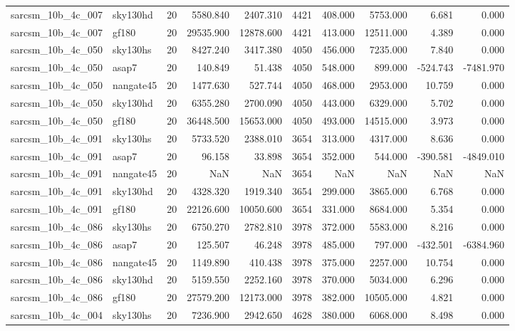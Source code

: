 \begin{longtable}{llrrrrrrrr}
sarcsm\_10b\_4c\_007 & sky130hd & 20 & 5580.840 & 2407.310 & 4421 & 408.000 & 5753.000 & 6.681 & 0.000 \\
sarcsm\_10b\_4c\_007 & gf180 & 20 & 29535.900 & 12878.600 & 4421 & 413.000 & 12511.000 & 4.389 & 0.000 \\
sarcsm\_10b\_4c\_050 & sky130hs & 20 & 8427.240 & 3417.380 & 4050 & 456.000 & 7235.000 & 7.840 & 0.000 \\
sarcsm\_10b\_4c\_050 & asap7 & 20 & 140.849 & 51.438 & 4050 & 548.000 & 899.000 & -524.743 & -7481.970 \\
sarcsm\_10b\_4c\_050 & nangate45 & 20 & 1477.630 & 527.744 & 4050 & 468.000 & 2953.000 & 10.759 & 0.000 \\
sarcsm\_10b\_4c\_050 & sky130hd & 20 & 6355.280 & 2700.090 & 4050 & 443.000 & 6329.000 & 5.702 & 0.000 \\
sarcsm\_10b\_4c\_050 & gf180 & 20 & 36448.500 & 15653.000 & 4050 & 493.000 & 14515.000 & 3.973 & 0.000 \\
sarcsm\_10b\_4c\_091 & sky130hs & 20 & 5733.520 & 2388.010 & 3654 & 313.000 & 4317.000 & 8.636 & 0.000 \\
sarcsm\_10b\_4c\_091 & asap7 & 20 & 96.158 & 33.898 & 3654 & 352.000 & 544.000 & -390.581 & -4849.010 \\
sarcsm\_10b\_4c\_091 & nangate45 & 20 & NaN & NaN & 3654 & NaN & NaN & NaN & NaN \\
sarcsm\_10b\_4c\_091 & sky130hd & 20 & 4328.320 & 1919.340 & 3654 & 299.000 & 3865.000 & 6.768 & 0.000 \\
sarcsm\_10b\_4c\_091 & gf180 & 20 & 22126.600 & 10050.600 & 3654 & 331.000 & 8684.000 & 5.354 & 0.000 \\
sarcsm\_10b\_4c\_086 & sky130hs & 20 & 6750.270 & 2782.810 & 3978 & 372.000 & 5583.000 & 8.216 & 0.000 \\
sarcsm\_10b\_4c\_086 & asap7 & 20 & 125.507 & 46.248 & 3978 & 485.000 & 797.000 & -432.501 & -6384.960 \\
sarcsm\_10b\_4c\_086 & nangate45 & 20 & 1149.890 & 410.438 & 3978 & 375.000 & 2257.000 & 10.754 & 0.000 \\
sarcsm\_10b\_4c\_086 & sky130hd & 20 & 5159.550 & 2252.160 & 3978 & 370.000 & 5034.000 & 6.296 & 0.000 \\
sarcsm\_10b\_4c\_086 & gf180 & 20 & 27579.200 & 12173.000 & 3978 & 382.000 & 10505.000 & 4.821 & 0.000 \\
sarcsm\_10b\_4c\_004 & sky130hs & 20 & 7236.900 & 2942.650 & 4628 & 380.000 & 6068.000 & 8.498 & 0.000 \\

\end{longtable}
